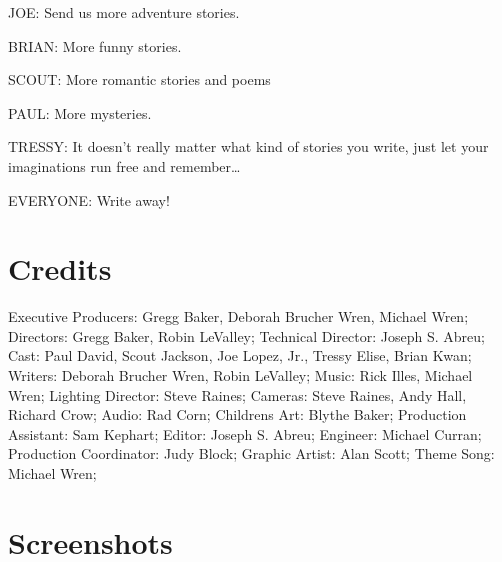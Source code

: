 JOE:
Send us more adventure stories.

BRIAN:
More funny stories.

SCOUT:
More romantic stories and poems

PAUL:
More mysteries.

TRESSY:
It doesn't really matter what kind of stories you write, just let your imaginations run free and remember\dots

EVERYONE:
Write away!

\section{Credits}

Executive Producers: Gregg Baker, Deborah Brucher Wren, Michael Wren;
Directors: Gregg Baker, Robin LeValley;
Technical Director: Joseph S. Abreu;
Cast: Paul David, Scout Jackson, Joe Lopez, Jr., Tressy Elise, Brian Kwan;
Writers: Deborah Brucher Wren, Robin LeValley;
Music: Rick Illes, Michael Wren;
Lighting Director: Steve Raines;
Cameras: Steve Raines, Andy Hall, Richard Crow;
Audio: Rad Corn;
Childrens Art: Blythe Baker;
Production Assistant: Sam Kephart;
Editor: Joseph S. Abreu;
Engineer: Michael Curran;
Production Coordinator: Judy Block;
Graphic Artist: Alan Scott;
Theme Song: Michael Wren;

\clearpage
\newpage

\section{Screenshots}

